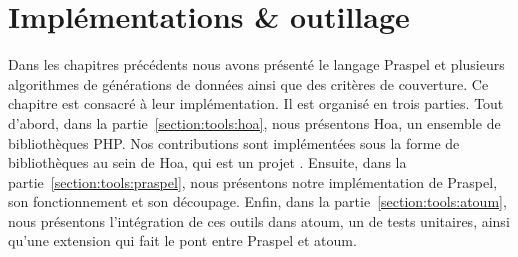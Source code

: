\chapter{Implémentations \& outillage}
\label{chapter:tools}

\mminitoc

Dans les chapitres précédents nous avons présenté le langage Praspel et
plusieurs algorithmes de générations de données ainsi que des critères de
couverture. Ce chapitre est consacré à leur implémentation. Il est organisé en
trois parties. Tout d'abord, dans la partie~\ref{section:tools:hoa}, nous
présentons Hoa, un ensemble de bibliothèques PHP. Nos contributions sont
implémentées sous la forme de bibliothèques au sein de Hoa, qui est un projet
. Ensuite, dans la partie~\ref{section:tools:praspel},
nous présentons notre implémentation de Praspel, son fonctionnement et son
découpage. Enfin, dans la partie~\ref{section:tools:atoum}, nous présentons
l'intégration de ces outils dans atoum, un  de tests
unitaires, ainsi qu'une extension qui fait le pont entre Praspel et atoum.

